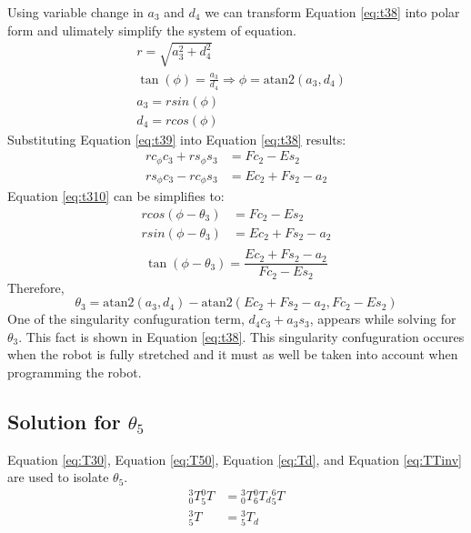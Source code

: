 Using variable change in $a_3$ and $d_4$ we can transform Equation \ref{eq:t38} into polar form and ulimately simplify
the system of equation.
\begin{equation} \label{eq:t39}
    \begin{aligned}
         & r=\sqrt{a_3^2+d_4^2}                                                 \\
         & \tan(\phi)=\frac{a_3}{d_4} \Rightarrow \phi=\mathrm{atan2}(a_3, d_4) \\
         & a_3=rsin(\phi)                                                       \\
         & d_4=rcos(\phi)
    \end{aligned}
\end{equation}
Substituting Equation \ref{eq:t39} into Equation \ref{eq:t38} results:
\begin{equation} \label{eq:t310}
    \begin{aligned}
        rc_\phi c_3 + rs_\phi s_3 & =Fc_2-Es_2     \\
        rs_\phi c_3 - rc_\phi s_3 & =Ec_2+Fs_2-a_2
    \end{aligned}
\end{equation}
Equation \ref{eq:t310} can be simplifies to:
\begin{equation} \label{eq:t311}
    \begin{aligned}
        rcos(\phi-\theta_3)   & =Fc_2-Es_2     \\
        rsin(\phi - \theta_3) & =Ec_2+Fs_2-a_2 \\
    \end{aligned}
\end{equation}
\begin{equation} \label{eq:t312}
    \tan\left(\phi - \theta_3\right)=\frac{Ec_2+Fs_2-a_2}{Fc_2-Es_2}
\end{equation}
Therefore,
\begin{equation} \label{eq:t313}
    \theta_3=\mathrm{atan2}(a_3, d_4) - \mathrm{atan2}(Ec_2+Fs_2-a_2, Fc_2-Es_2)
\end{equation}
One of the singularity confuguration term, $d_4c_3+a_3s_3$, appears while solving for $\theta_3$.
This fact is shown in Equation \ref{eq:t38}.
This singularity confuguration occures when the robot is fully stretched and it must as well be taken into
account when programming the robot.
\subsection{Solution for $\theta_5$}
Equation \ref{eq:T30}, Equation \ref{eq:T50}, Equation \ref{eq:Td}, and Equation \ref{eq:TTinv} are used to isolate $\theta_5$.
\begin{equation} \label{eq:t51}
    \begin{aligned}
        {_0^{3}}T{_5^{0}}T & ={_0^{3}}T{_6^{0}}T_d{_5^{6}}T \\
        {_5^{3}}T          & ={_5^{3}}T_d
    \end{aligned}
\end{equation}

